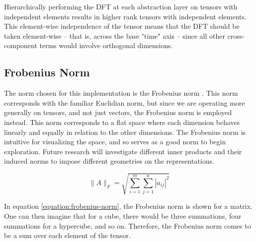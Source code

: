 Hierarchically performing the DFT at each abstraction layer on tensors with independent elements results in higher rank tensors with independent elements.  This element-wise independence of the tensor means that the DFT should be taken element-wise -- that is, across the base "time" axis -- since all other cross-component terms would involve orthogonal dimensions.

\subsection{Frobenius Norm}
\label{section:frobenius-norm}

The norm chosen for this implementation is the Frobenius norm \citep{horn1990norms}.  This norm corresponds with the familiar Euclidian norm, but since we are operating more generally on tensors, and not just vectors, the Frobenius norm is employed instead.  This norm corresponds to a flat space where each dimension behaves linearly and equally in relation to the other dimensions.  The Frobenius norm is intuitive for visualizing the space, and so serves as a good norm to begin exploration.  Future research will investigate different inner products and their induced norms to impose different geometries on the representations.

\begin{equation}
  \label{equation:frobenius-norm}
  \|A\|_F = \sqrt{\sum_{i=1}^m \sum_{j=1}^n |a_{ij}|^2}
\end{equation}

In equation \ref{equation:frobenius-norm}, the Frobenius norm is shown for a matrix.  One can then imagine that for a cube, there would be three summations, four summations for a hypercube, and so on.  Therefore, the Frobenius norm comes to be a sum over each element of the tensor.
